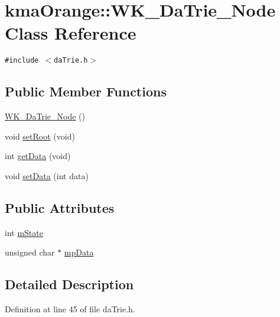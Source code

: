 \hypertarget{classkmaOrange_1_1WK__DaTrie__Node}{
\section{kmaOrange::WK\_\-DaTrie\_\-Node Class Reference}
\label{classkmaOrange_1_1WK__DaTrie__Node}
}
{\tt \#include $<$daTrie.h$>$}

\subsection*{Public Member Functions}
\begin{CompactItemize}
\item 
\hyperlink{classkmaOrange_1_1WK__DaTrie__Node_b489b164b42cde72d1237b36682a5417}{WK\_\-DaTrie\_\-Node} ()
\item 
void \hyperlink{classkmaOrange_1_1WK__DaTrie__Node_e2af113cda423d743621f200903f104b}{setRoot} (void)
\item 
int \hyperlink{classkmaOrange_1_1WK__DaTrie__Node_d1035d188f70a5f3911aa553c48c07e4}{getData} (void)
\item 
void \hyperlink{classkmaOrange_1_1WK__DaTrie__Node_e2cd732b26b4423dfe36ea4513032924}{setData} (int data)
\end{CompactItemize}
\subsection*{Public Attributes}
\begin{CompactItemize}
\item 
int \hyperlink{classkmaOrange_1_1WK__DaTrie__Node_d2e9e3e2bb4456ad4851ade93fe63978}{mState}
\item 
unsigned char $\ast$ \hyperlink{classkmaOrange_1_1WK__DaTrie__Node_618a7bf2137a1996a15da4b572ce1807}{mpData}
\end{CompactItemize}


\subsection{Detailed Description}


Definition at line 45 of file daTrie.h.

